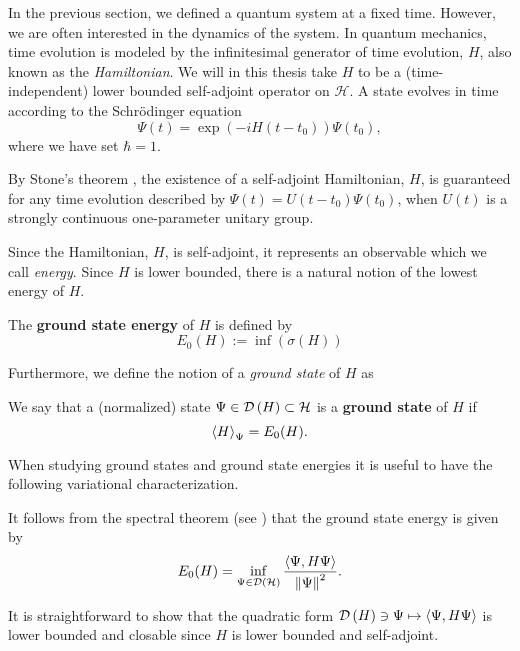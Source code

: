 In the previous section, we defined a quantum system at a fixed time. However, we are often interested in the dynamics of the system. In quantum mechanics, time evolution is modeled by the infinitesimal generator of time evolution, $ H $, also known as the \emph{Hamiltonian}. We will in this thesis take $ H $ to be a (time-independent) lower bounded self-adjoint operator on $ \mathcal{H} $. A state evolves in time according to the Schr\"odinger equation\begin{equation*}
\Psi(t)=\exp\left(-iH(t-t_0)\right)\Psi(t_0),
\end{equation*}
where we have set $ \hbar=1 $.
\begin{remark}
	By Stone's theorem \cite{reed1981functional}, the existence of a self-adjoint Hamiltonian, $ H $, is guaranteed for any time evolution described by $ \Psi(t)=U(t-t_0)\Psi(t_0) $, when $ U(t) $ is a strongly continuous one-parameter unitary group.
\end{remark}
Since the Hamiltonian, $ H $, is self-adjoint, it represents an observable which we call \emph{energy}. Since $ H $ is lower bounded, there is a natural notion of the lowest energy of $ H $.
\begin{definition}
	The \textbf{ground state energy} of $ H $ is defined by 
	$$
	E_0(H):=\inf(\sigma(H))
	$$
\end{definition}
Furthermore, we define the notion of a \emph{ground state} of $ H $ as
\begin{definition}
	We say that a (normalized) state $ \Psi\in \mathcal D\left(H\right)\subset \mathcal{H} $ is a \textbf{ground state} of $ H $ if $$ \left\langle H\right\rangle_\Psi=E_0(H). $$
\end{definition}
When studying ground states and ground state energies it is useful to have the following variational characterization.
\begin{remark}\label{RemarkVariationalPrinciple1}
	It follows from the spectral theorem (see \cite{reed1981functional}) that the ground state energy is given by \begin{equation}\label{EqVariationalGroundStateEnergyOperator}
		E_0(H)=\inf_{\Psi\in \mathcal D\left(\mathcal{H}\right)}\frac{\left\langle\Psi,H\Psi\right\rangle}{\left\lVert \Psi \right\rVert^2}.
	\end{equation}
\end{remark}
\begin{remark}
	It is straightforward to show that the quadratic form $ \mathcal D\left(H\right)\ni\Psi\mapsto\left\langle\Psi,H\Psi\right\rangle $ is lower bounded and closable since $ H $ is lower bounded and self-adjoint.
\end{remark}
